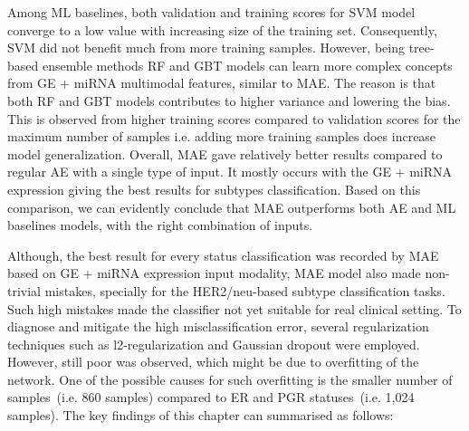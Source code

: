 \hspace*{3.5mm} Among ML baselines, both validation and training scores for SVM model converge to a low value with increasing size of the training set. Consequently, SVM did not benefit much from more training samples. However, being tree-based ensemble methods RF and GBT models can learn more complex concepts from GE + miRNA multimodal features, similar to MAE. The reason is that both RF and GBT models contributes to higher variance and lowering the bias. This is observed from higher training scores compared to validation scores for the maximum number of samples i.e. adding more training samples does increase model generalization. Overall, MAE gave relatively better results compared to regular AE with a single type of input. 
It mostly occurs with the GE + miRNA expression giving the best results for subtypes classification.
Based on this comparison, we can evidently conclude that MAE outperforms both AE and ML baselines models, with the right combination of inputs.

\hspace*{3.5mm} Although, the best result for every status classification was recorded by MAE based on GE + miRNA expression input modality, MAE model also made non-trivial mistakes, specially for the HER2/neu-based subtype classification tasks. Such high mistakes made the classifier not yet suitable for real clinical setting. To diagnose and mitigate the high misclassification error, several regularization techniques such as l2-regularization and Gaussian dropout were employed. However, still poor was observed, which might be due to overfitting of the network. One of the possible causes for such overfitting is the smaller number of samples~(i.e. 860 samples) compared to ER and PGR statuses~(i.e. 1,024 samples). The key findings of this chapter can summarised as follows: 

